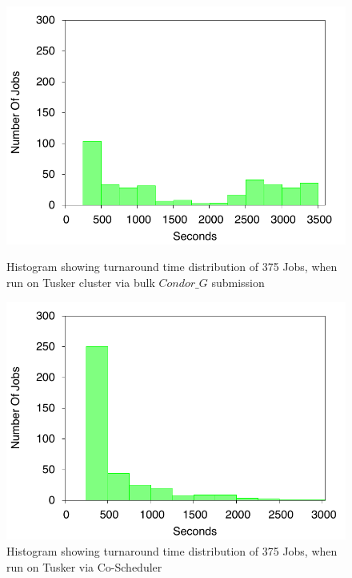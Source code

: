 \documentclass[ms,electronic,double]{nuthesis}
\begin{document}
\begin{figure}[h!]
\begin{center}
\includegraphics{images/tusker_histogram}
\caption{Histogram showing turnaround time distribution of 375 Jobs, when run on Tusker cluster via bulk $Condor\_G$ submission}
\label{fig:tusker_histogram}
\end{center}

\begin{center}
\includegraphics{images/coscheduler_histogram}
\caption{Histogram showing turnaround time distribution of 375 Jobs, when run on Tusker  via Co-Scheduler}
\label{fig:coscheduler_histogram}
\end{center}


\end{figure}
\FloatBarrier
\end{document}
